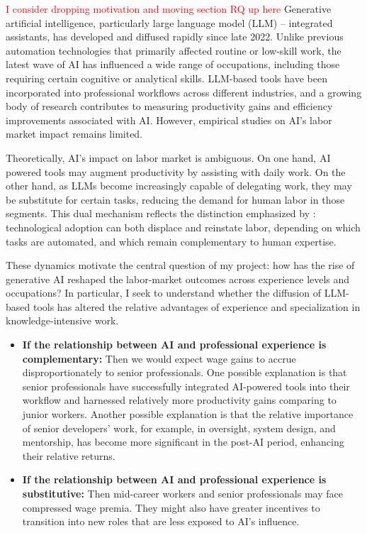\documentclass[12pt]{article}
\begin{document}
\iffalse
\textcolor{red}{I consider dropping motivation and moving section RQ up here}
\noindent
Generative artificial intelligence, particularly large language model (LLM) – integrated assistants, has developed and diffused rapidly since late 2022. Unlike previous automation technologies that primarily affected routine or low-skill work, the latest wave of AI has influenced a wide range of occupations, including those requiring certain cognitive or analytical skills. LLM-based tools have been incorporated into professional workflows across different industries, and a growing body of research contributes to measuring productivity gains and efficiency improvements associated with AI. However, empirical studies on AI’s labor market impact remains limited.

\medskip
\noindent
Theoretically, AI’s impact on labor market is ambiguous. On one hand, AI powered tools may augment productivity by assisting with daily work. On the other hand, as LLMs become increasingly capable of delegating work, they may be substitute for certain tasks, reducing the demand for human labor in those segments. This dual mechanism reflects the distinction emphasized by \cite{acemoglu2019automation}: technological adoption can both displace and reinstate labor, depending on which tasks are automated, and which remain complementary to human expertise. 

\medskip
\noindent
These dynamics motivate the central question of my project: how has the rise of generative AI reshaped the labor-market outcomes across experience levels and occupations? In particular, I seek to understand whether the diffusion of LLM-based tools has altered the relative advantages of experience and specialization in knowledge-intensive work. 
\begin{itemize}
    \item \textbf{If the relationship between AI and professional experience is complementary:} Then we would expect wage gains to accrue disproportionately to senior professionals. One possible explanation is that senior professionals have successfully integrated AI-powered tools into their workflow and harnessed relatively more productivity gains comparing to junior workers. Another possible explanation is that the relative importance of senior developers’ work, for example, in oversight, system design, and mentorship, has become more significant in the post-AI period, enhancing their relative returns. 
    \item \textbf{If the relationship between AI and professional experience is substitutive:} Then mid-career workers and senior professionals may face compressed wage premia. They might also have greater incentives to transition into new roles that are less exposed to AI's influence. 
\end{itemize}
\end{document}

